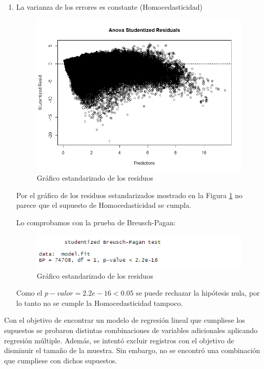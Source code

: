 \documentclass[a4paper,10pt,twocolumn]{report}
\begin{document}
\begin{enumerate}
		\item La varianza de los errores es constante (Homocedasticidad)
		
		\begin{figure}[H]
			\centering
			\includegraphics[width=0.7\linewidth]{img/regression/studentized}
			\caption{Gráfico estandarizado de los residuos}
			\label{fig:studentized}
		\end{figure}
		
		Por el gráfico de los residuos estandarizados mostrado en la Figura \ref{fig:studentized} no parece que el supuesto de Homocedasticidad se cumpla.	
		
		Lo comprobamos con la prueba de Breusch-Pagan:
		
		\begin{figure}[H]
			\centering
			\includegraphics[width=\linewidth]{img/regression/studentized_test}
			\caption{Gráfico estandarizado de los residuos}
			\label{fig:studentized_test}
		\end{figure}
		
		Como el $p-valor = 2.2e-16 < 0.05$ se puede rechazar la hipótesis nula, por lo tanto no se cumple la Homocedasticidad tampoco.
		
	\end{enumerate}
		
	Con el objetivo de encontrar un modelo de regresión lineal que cumpliese los supuestos se probaron distintas combinaciones de variables adicionales aplicando regresión múltiple. Además, se intentó excluir registros con el objetivo de disminuir el tamaño de la muestra. Sin embargo, no se encontró una combinación que cumpliese con dichos supuestos.
		
\end{document}
